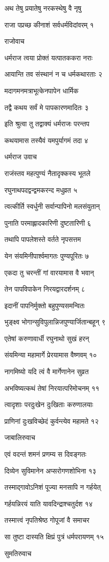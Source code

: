 अथ तेषु प्रयातेषु नरकस्थेषु वै नृषु

राजा पप्रच्छ कीनाशं सर्वधर्मविदांवरम् १

राजोवाच

धर्मराज त्वया प्रोक्तं यत्पातककरा नराः

आयान्ति तव संस्थानं न च धर्मकथारताः २

मदागमनमत्राभूत्केनपापेन धार्मिक

तद्वै कथय सर्वं मे पापकारणमादितः ३

इति श्रुत्वा तु तद्वाक्यं धर्मराजः परन्तप

कथयामास तस्यैवं यमपुर्यागमं तदा ४

धर्मराज उवाच

राजंस्तव महत्पुण्यं नैतादृक्कस्य भूतले

रघुनाथपदद्वन्द्वमकरन्द मधुव्रत ५

त्वत्कीर्ति स्वर्धुनी सर्वान्पापिनो मलसंयुतान्

पुनाति परमाह्लादकारिणी दुष्टतारिणी ६

तथापि पापलेशस्ते वर्तते नृपसत्तम

येन संयमिनीपार्श्वमागतः पुण्यपूरितः ७

एकदा तु चरन्तीं गां वारयामास वै भवान्

तेन पापविपाकेन निरयद्वारदर्शनम् ८

इदानीं पापनिर्मुक्तो बहुपुण्यसमन्वितः

भुङ्क्ष्व भोगान्सुविपुलान्निजपुण्यार्जितान्बहून् ९

एतेषां करुणावार्धी रघुनाथो सुखं हरन्

संयमिन्या महामार्गे प्रेरयामास वैष्णवम् १०

नागमिष्यो यदि त्वं वै मार्गेणानेन सुव्रत

अभविष्यत्कथं तेषां निरयात्परिमोचनम् ११

त्वादृशाः परदुःखेन दुःखिताः करुणालयाः

प्राणिनां दुःखविच्छेदं कुर्वन्त्येव महामते १२

जाबालिरुवाच

एवं वदन्तं शमनं प्रणम्य स दिवङ्गतः

दिव्येन सुविमानेन अप्सरोगणशोभिना १३

तस्माद्गावोऽनिशं पूज्या मनसापि न गर्हयेत्

गर्हयन्निरयं याति यावदिन्द्राश्चतुर्दश १४

तस्मात्त्वं नृपतिश्रेष्ठ गोपूजां वै समाचर

सा तुष्टा दास्यति क्षिप्रं पुत्रं धर्मपरायणम् १५

सुमतिरुवाच

